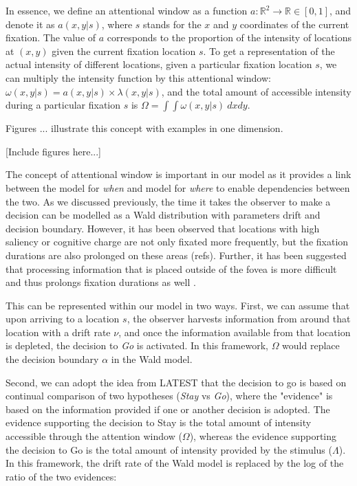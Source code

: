 \documentclass{article}
\begin{document}
In essence, we define an attentional window as a function $a: \mathbb{R}^2 \rightarrow \mathbb{R} \in [0, 1]$, and denote it as $a(x, y | s)$, where $s$ stands for the $x$ and $y$ coordinates of the current fixation. The value of $a$ corresponds to the proportion of the intensity of locations at $(x, y)$ given the current fixation location $s$. To get a representation of the actual intensity of different locations, given a particular fixation location $s$, we can multiply the intensity function by this attentional window: $\omega(x, y | s) = a(x, y | s)\times\lambda(x, y | s)$, and the total amount of accessible intensity during a particular fixation $s$ is $\Omega = \int\int \omega(x, y | s)~dx dy$.

Figures ... illustrate this concept with examples in one dimension.

[Include figures here...]

The concept of attentional window is important in our model as it provides a link between the model for \textit{when} and model for \textit{where} to enable dependencies between the two. As we discussed previously, the time it takes the observer to make a decision can be modelled as a Wald distribution with parameters drift and decision boundary. However, it has been observed that locations with high saliency or cognitive charge are not only fixated more frequently, but the fixation durations are also prolonged on these areas (refs). Further, it has been suggested that processing information that is placed outside of the fovea is more difficult and thus prolongs fixation durations as well \citep{nuthmann2010crisp,nuthmann2017fixation_durations}. 

This can be represented within our model in two ways. First, we can assume that upon arriving to a location $s$, the observer harvests information from around that location with a drift rate $\nu$, and once the information available from that location is depleted, the decision to \textit{Go} is activated. In this framework, $\Omega$ would replace the decision boundary $\alpha$ in the Wald model.

Second, we can adopt the idea from LATEST that the decision to go is based on continual comparison of two hypotheses (\textit{Stay} vs \textit{Go}), where the "evidence" is based on the information provided if one or another decision is adopted. The evidence supporting the decision to Stay is the total amount of intensity accessible through the attention window ($\Omega$), whereas the evidence supporting the decision to Go is the total amount of intensity provided by the stimulus ($\Lambda$). In this framework, the drift rate of the Wald model is replaced by the log of the ratio of the two evidences:
\end{document}
